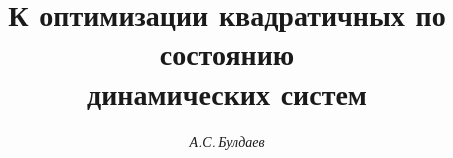 

 


% 


\newcommand{\la}{\langle} 


\newcommand{\ra}{\rangle} 


\newcommand{\sign}{\operatorname{sign}} 


\newcommand{\myfont}{\series{m}\shape{n}\selectfont} 


\renewcommand{\baselinestretch}{0.97}


\newcommand{\tts}[1]{} 


 




\setcounter{page}{30} 












 


\author{\it А.С.\,Булдаев} 




\title{К оптимизации квадратичных по состоянию\\ 


динамических систем}


 


\date{} 




\pagestyle{plain} %


 




\maketitle 


